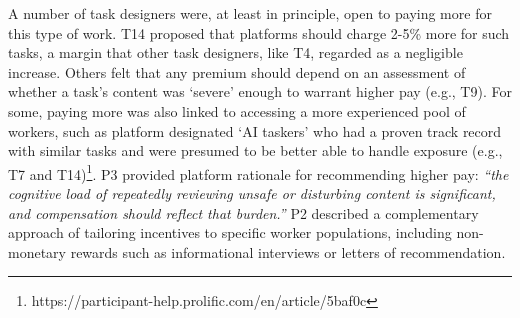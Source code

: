 A number of task designers were, at least in principle, open to paying more for this type of work.
T14 proposed that platforms should charge 2-5\% more for such tasks, a margin that other task designers, like T4, regarded as a negligible increase. Others felt that any premium should depend on an assessment of whether a task's content was `severe' enough to warrant higher pay (e.g., T9). For some, paying more was also linked to accessing a more experienced pool of workers, such as platform designated `AI taskers' who had a proven track record with similar tasks and were presumed to be better able to handle exposure (e.g., T7 and T14)\footnote{https://participant-help.prolific.com/en/article/5baf0c}. P3 provided platform rationale for recommending higher pay: \textit{``the cognitive load of repeatedly reviewing unsafe or disturbing content is significant, and compensation should reflect that burden.''} 
P2 described a complementary approach of tailoring incentives to specific worker populations, including non-monetary rewards such as informational interviews or letters of recommendation.


